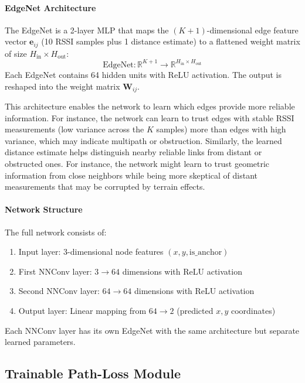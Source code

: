 \documentclass[master,final,11pt]{iscs-thesis}
\begin{document}
\paragraph{EdgeNet Architecture}
The EdgeNet is a 2-layer MLP that maps the $(K+1)$-dimensional edge feature vector $\mathbf{e}_{ij}$ (10 RSSI samples plus 1 distance estimate) to a flattened weight matrix of size $H_{\text{in}} \times H_{\text{out}}$:
\begin{equation}
    \text{EdgeNet}: \mathbb{R}^{K+1} \rightarrow \mathbb{R}^{H_{\text{in}} \times H_{\text{out}}}
\end{equation}
Each EdgeNet contains 64 hidden units with ReLU activation.
The output is reshaped into the weight matrix $\mathbf{W}_{ij}$.

This architecture enables the network to learn which edges provide more reliable information. For instance, the network can learn to trust edges with stable RSSI measurements (low variance across the $K$ samples) more than edges with high variance, which may indicate multipath or obstruction. Similarly, the learned distance estimate helps distinguish nearby reliable links from distant or obstructed ones.
For instance, the network might learn to trust geometric information from close neighbors while being more skeptical of distant measurements that may be corrupted by terrain effects.

\paragraph{Network Structure}
The full network consists of:
\begin{enumerate}
    \item Input layer: 3-dimensional node features $(x, y, \text{is\_anchor})$
    \item First NNConv layer: $3 \rightarrow 64$ dimensions with ReLU activation
    \item Second NNConv layer: $64 \rightarrow 64$ dimensions with ReLU activation
    \item Output layer: Linear mapping from $64 \rightarrow 2$ (predicted $x, y$ coordinates)
\end{enumerate}

Each NNConv layer has its own EdgeNet with the same architecture but separate learned parameters.

\subsection{Trainable Path-Loss Module}
\end{document}
